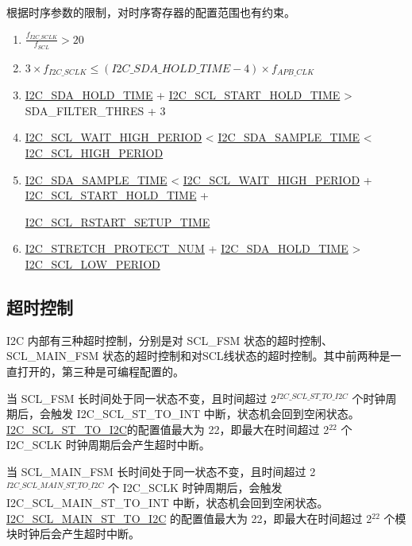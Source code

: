 \documentclass[main\_\_CN.tex]{subfiles}
\begin{document}
根据时序参数的限制，对时序寄存器的配置范围也有约束。
\begin{enumerate}
\item $\frac{f_{I2C\_SCLK}}{f_{SCL}} > 20$
\item $3 \times f_{I2C\_SCLK} \leq (\hyperref[fielddesc:I2CSDAHOLDTIME]{I2C\_SDA\_HOLD\_TIME}-4) \times f_{APB\_CLK}$
\item \hyperref[fielddesc:I2CSDAHOLDTIME]{I2C\_SDA\_HOLD\_TIME} + \hyperref[fielddesc:I2CSCLSTARTHOLDTIME]{I2C\_SCL\_START\_HOLD\_TIME} > SDA\_FILTER\_THRES + 3
\item \hyperref[fielddesc:I2CSCLWAITHIGHPERIOD]{I2C\_SCL\_WAIT\_HIGH\_PERIOD} < \hyperref[fielddesc:I2CSDASAMPLETIME]{I2C\_SDA\_SAMPLE\_TIME} < \hyperref[fielddesc:I2CSCLHIGHPERIOD]{I2C\_SCL\_HIGH\_PERIOD}
\item \hyperref[fielddesc:I2CSDASAMPLETIME]{I2C\_SDA\_SAMPLE\_TIME} < \hyperref[fielddesc:I2CSCLWAITHIGHPERIOD]{I2C\_SCL\_WAIT\_HIGH\_PERIOD} + \hyperref[fielddesc:I2CSCLSTARTHOLDTIME]{I2C\_SCL\_START\_HOLD\_TIME} +

\hyperref[fielddesc:I2CSCLRSTARTSETUPTIME]{I2C\_SCL\_RSTART\_SETUP\_TIME}
\item \hyperref[fielddesc:I2CSTRETCHPROTECTNUM]{I2C\_STRETCH\_PROTECT\_NUM} + \hyperref[fielddesc:I2CSDAHOLDTIME]{I2C\_SDA\_HOLD\_TIME} > \hyperref[fielddesc:I2CSCLLOWPERIOD]{I2C\_SCL\_LOW\_PERIOD}
\end{enumerate}

\subsection{超时控制}
I2C 内部有三种超时控制，分别是对 SCL\_FSM 状态的超时控制、SCL\_MAIN\_FSM 状态的超时控制和对SCL线状态的超时控制。其中前两种是一直打开的，第三种是可编程配置的。

当 SCL\_FSM 长时间处于同一状态不变，且时间超过 2$^{\hyperref[fielddesc:I2CSCLSTTOI2C]{I2C\_SCL\_ST\_TO\_I2C}}$ 个时钟周期后，会触发 I2C\_SCL\_ST\_TO\_INT 中断，状态机会回到空闲状态。\hyperref[fielddesc:I2CSCLSTTOI2C]{I2C\_SCL\_ST\_TO\_I2C}的配置值最大为 22，即最大在时间超过 2$^{22}$ 个 I2C\_SCLK 时钟周期后会产生超时中断。

当 SCL\_MAIN\_FSM 长时间处于同一状态不变，且时间超过 2$^{ \hyperref[fielddesc:I2CSCLMAINSTTOI2C]{I2C\_SCL\_MAIN\_ST\_TO\_I2C} }$ 个 I2C\_SCLK 时钟周期后，会触发 I2C\_SCL\_MAIN\_ST\_TO\_INT 中断，状态机会回到空闲状态。\hyperref[fielddesc:I2CSCLMAINSTTOI2C]{I2C\_SCL\_MAIN\_ST\_TO\_I2C} 的配置值最大为 22，即最大在时间超过 2$^{22}$ 个模块时钟后会产生超时中断。
\end{document}
